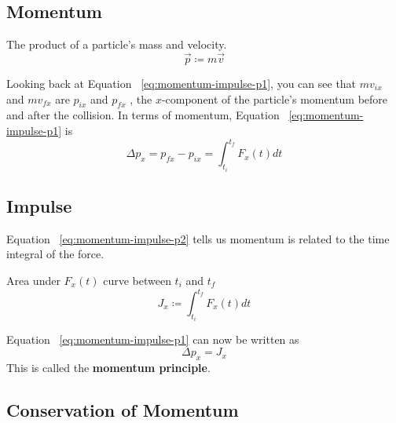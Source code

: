 \subsection{Momentum}

\begin{definition}[Momentum]
    The product of a particle's mass and velocity.
    \begin{equation}
        \vec{p} \coloneqq m\vec{v}
    \end{equation}
\end{definition}

Looking back at Equation~%
\ref{eq:momentum-impulse-p1}, you can see that
$
    mv_{ix}
$ and
$
    mv_{fx}
$ are
$
    p_{ix}
$ and
$
    p_{fx}
$%
, the
$
    x
$-component of the particle's momentum before and after the collision.
In terms of momentum, Equation~%
\ref{eq:momentum-impulse-p1} is
\begin{equation}
    \label{eq:momentum-impulse-p2} \Delta p_x = p_{fx} - p_{ix} = \int_{t_i}^
    {t_f} F_x(t) dt
\end{equation}

\subsection{Impulse}

Equation~%
\ref{eq:momentum-impulse-p2} tells us momentum is related to the time
integral of the force.

\begin{definition}[Impulse]
    Area under
    $
        F_x(t)
    $ curve between
    $
        t_i
    $ and
    $
        t_f
    $
    \begin{equation}
        J_x \coloneqq \int_{t_i}^{t_f} F_x(t) dt
    \end{equation}
\end{definition}

Equation~%
\ref{eq:momentum-impulse-p1} can now be written as
\begin{equation}
    \Delta p_x = J_x
\end{equation}
This is called the \textbf{momentum principle}.

\subsection{Conservation of Momentum}

